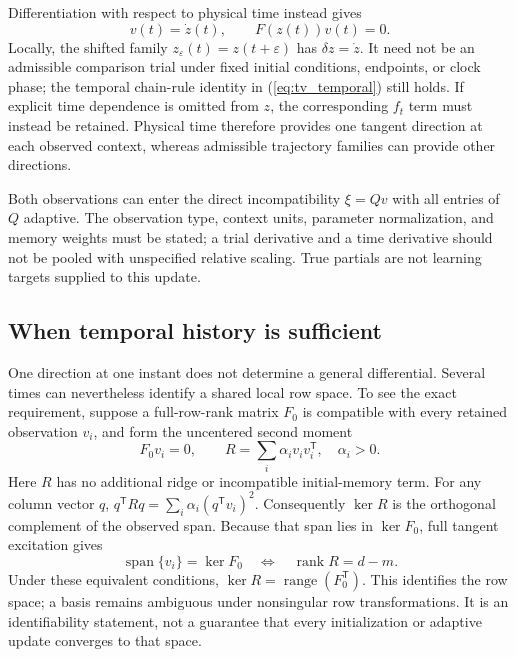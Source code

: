 \documentclass[journal]{IEEEtran}
\begin{document}
Differentiation with respect to physical time instead gives
\begin{equation}
 v(t)=\dot z(t),\qquad F(z(t))v(t)=0.
 \label{eq:tv_temporal}
\end{equation}
Locally, the shifted family $z_\varepsilon(t)=z(t+\varepsilon)$ has
$\delta z=\dot z$. It need not be an admissible comparison trial under fixed
initial conditions, endpoints, or clock phase; the temporal chain-rule
identity in (\ref{eq:tv_temporal}) still holds. If explicit time dependence
is omitted from $z$, the corresponding $f_t$ term must instead be retained.
Physical time therefore provides one tangent direction at each observed
context, whereas admissible trajectory families can provide other directions.

Both observations can enter the direct incompatibility $\xi=Qv$ with all
entries of $Q$ adaptive. The observation type, context units, parameter
normalization, and memory weights must be stated; a trial derivative and a
time derivative should not be pooled with unspecified relative scaling.
True partials are not learning targets supplied to this update.

\subsection{When temporal history is sufficient}
One direction at one instant does not determine a general differential.
Several times can nevertheless identify a shared local row space. To see
the exact requirement, suppose a full-row-rank matrix $F_0$ is compatible
with every retained observation $v_i$, and form the uncentered second moment
\begin{equation}
 F_0v_i=0,\qquad
 R=\sum_i\alpha_i v_iv_i^{\mathsf T},\quad \alpha_i>0.
 \label{eq:tv_covariance}
\end{equation}
Here $R$ has no additional ridge or incompatible initial-memory term.
For any column vector $q$,
$q^{\mathsf T}Rq=\sum_i\alpha_i(q^{\mathsf T}v_i)^2$.
Consequently $\ker R$ is the orthogonal complement of the observed span.
Because that span lies in $\ker F_0$, full tangent excitation gives
\begin{equation}
 \operatorname{span}\{v_i\}=\ker F_0
 \quad\Longleftrightarrow\quad \operatorname{rank}R=d-m.
 \label{eq:tv_identification}
\end{equation}
Under these equivalent conditions,
$\ker R=\operatorname{range}(F_0^{\mathsf T})$.
This identifies the row space; a basis remains ambiguous under nonsingular
row transformations. It is an identifiability statement, not a guarantee
that every initialization or adaptive update converges to that space.
\end{document}
